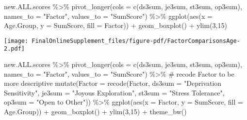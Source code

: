\documentclass[
  letterpaper,
  DIV=11,
  numbers=noendperiod]{scrartcl}
\newenvironment{Shaded}{\begin{snugshade}}{\end{snugshade}}
\newcommand{\AttributeTok}[1]{\textcolor[rgb]{0.40,0.45,0.13}{#1}}
\newcommand{\CommentTok}[1]{\textcolor[rgb]{0.37,0.37,0.37}{#1}}
\newcommand{\DecValTok}[1]{\textcolor[rgb]{0.68,0.00,0.00}{#1}}
\newcommand{\FunctionTok}[1]{\textcolor[rgb]{0.28,0.35,0.67}{#1}}
\newcommand{\NormalTok}[1]{\textcolor[rgb]{0.00,0.23,0.31}{#1}}
\newcommand{\SpecialCharTok}[1]{\textcolor[rgb]{0.37,0.37,0.37}{#1}}
\newcommand{\StringTok}[1]{\textcolor[rgb]{0.13,0.47,0.30}{#1}}
\begin{document}
\begin{Shaded}
\begin{Highlighting}[]
\NormalTok{new.ALL.scores }\SpecialCharTok{\%\textgreater{}\%}
  \FunctionTok{pivot\_longer}\NormalTok{(}\AttributeTok{cols =} \FunctionTok{c}\NormalTok{(ds3sum, je3sum, st3sum, op3sum), }
               \AttributeTok{names\_to =} \StringTok{"Factor"}\NormalTok{, }
               \AttributeTok{values\_to =} \StringTok{"SumScore"}\NormalTok{) }\SpecialCharTok{\%\textgreater{}\%}
  \FunctionTok{ggplot}\NormalTok{(}\FunctionTok{aes}\NormalTok{(}\AttributeTok{x =}\NormalTok{ Age.Group, }
             \AttributeTok{y =}\NormalTok{ SumScore, }
             \AttributeTok{fill =}\NormalTok{ Factor)) }\SpecialCharTok{+}
  \FunctionTok{geom\_boxplot}\NormalTok{() }\SpecialCharTok{+}
  \FunctionTok{ylim}\NormalTok{(}\DecValTok{3}\NormalTok{,}\DecValTok{15}\NormalTok{)}
\end{Highlighting}
\end{Shaded}

\texttt{[image: FinalOnlineSupplement\_files/figure-pdf/FactorComparisonsAge-2.pdf]}

\begin{Shaded}
\begin{Highlighting}[]
\NormalTok{new.ALL.scores }\SpecialCharTok{\%\textgreater{}\%}
  \FunctionTok{pivot\_longer}\NormalTok{(}\AttributeTok{cols =} \FunctionTok{c}\NormalTok{(ds3sum, je3sum, st3sum, op3sum), }
               \AttributeTok{names\_to =} \StringTok{"Factor"}\NormalTok{, }
               \AttributeTok{values\_to =} \StringTok{"SumScore"}\NormalTok{) }\SpecialCharTok{\%\textgreater{}\%}
  \CommentTok{\# recode Factor to be more descriptive}
  \FunctionTok{mutate}\NormalTok{(}\AttributeTok{Factor =} \FunctionTok{recode}\NormalTok{(Factor, }
                         \AttributeTok{ds3sum =} \StringTok{"Deprivation Sensitivity"}\NormalTok{, }
                         \AttributeTok{je3sum =} \StringTok{"Joyous Exploration"}\NormalTok{, }
                         \AttributeTok{st3sum =} \StringTok{"Stress Tolerance"}\NormalTok{, }
                         \AttributeTok{op3sum =} \StringTok{"Open to Other"}\NormalTok{)) }\SpecialCharTok{\%\textgreater{}\%}
  \FunctionTok{ggplot}\NormalTok{(}\FunctionTok{aes}\NormalTok{(}\AttributeTok{x =}\NormalTok{ Factor, }
             \AttributeTok{y =}\NormalTok{ SumScore, }
             \AttributeTok{fill =}\NormalTok{ Age.Group)) }\SpecialCharTok{+}
  \FunctionTok{geom\_boxplot}\NormalTok{() }\SpecialCharTok{+}
  \FunctionTok{ylim}\NormalTok{(}\DecValTok{3}\NormalTok{,}\DecValTok{15}\NormalTok{) }\SpecialCharTok{+}
  \FunctionTok{theme\_bw}\NormalTok{()}
\end{Highlighting}
\end{Shaded}
\end{document}
